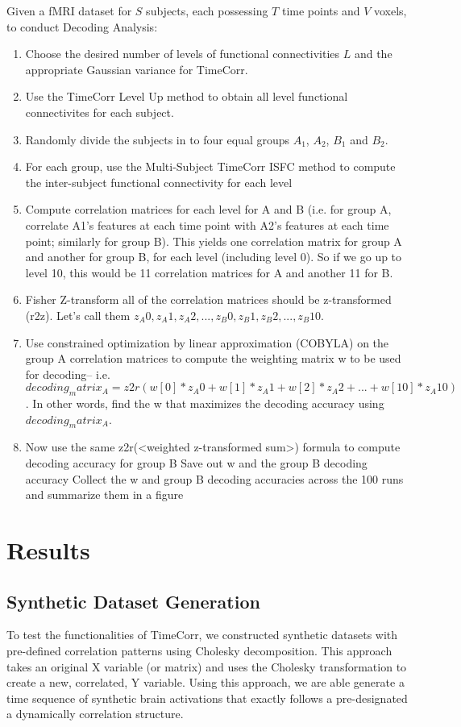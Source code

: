 \documentclass[12pt]{article}
\begin{document}
Given a fMRI dataset for $S$ subjects, each possessing $T$ time points and $V$ voxels, to conduct Decoding Analysis:
\begin{enumerate}
\item Choose the desired number of levels of functional connectivities $L$ and the appropriate Gaussian variance for TimeCorr.
\item Use the TimeCorr Level Up method to obtain all level functional connectivites for each subject.
\item Randomly divide the subjects in to four equal groups $A_1$, $A_2$, $B_1$ and $B_2$.
\item For each group, use the Multi-Subject TimeCorr ISFC method to compute the inter-subject functional connectivity for each level
\item Compute correlation matrices for each level for A and B (i.e. for group A, correlate A1's features at each time point with A2's features at each time point; similarly for group B). This yields one correlation matrix for group A and another for group B, for each level (including level 0). So if we go up to level 10, this would be 11 correlation matrices for A and another 11 for B.
\item Fisher Z-transform all of the correlation matrices should be z-transformed (r2z). Let's call them $z_A0, z_A1, z_ A2, ..., z_B0, z_B1, z_B2, ..., z_B10$.
\item Use constrained optimization by linear approximation (COBYLA) on the group A correlation matrices to compute the weighting matrix w to be used for decoding-- i.e. $decoding_matrix_A = z2r(w[0]*z_A0 + w[1]*z_A1 + w[2]*z_A2 + ... + w[10]*z_A10)$. In other words, find the w that maximizes the decoding accuracy using $decoding_matrix_A$.
\item Now use the same z2r(<weighted z-transformed sum>) formula to compute decoding accuracy for group B
Save out w and the group B decoding accuracy
Collect the w and group B decoding accuracies across the 100 runs and summarize them in a figure
\end{enumerate}

\section{Results}
\subsection{Synthetic Dataset Generation}
To test the functionalities of TimeCorr, we constructed synthetic datasets with pre-defined correlation patterns using Cholesky decomposition. This approach takes an original X variable (or matrix) and uses the Cholesky transformation to create a new, correlated, Y variable. Using this approach, we are able generate a time sequence of synthetic brain activations that exactly follows a pre-designated a dynamically correlation structure.
\end{document}
